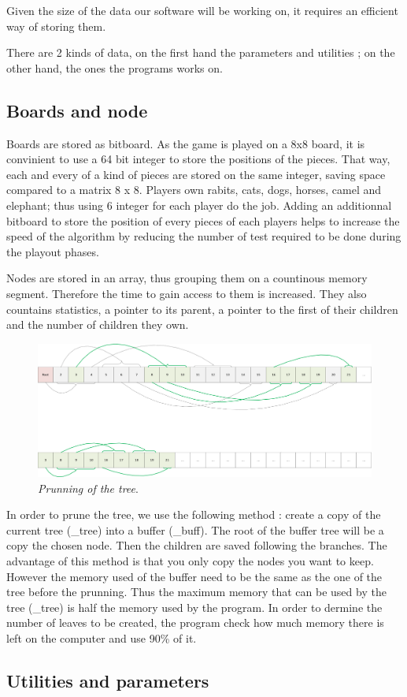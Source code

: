 Given the size of the data our software will be working on, it requires an efficient way of storing them.

There are 2 kinds of data, on the first hand the parameters and utilities ; on the other hand, the ones the programs works on.
\subsection{Boards and node}
Boards are stored as bitboard. As the game is played on a 8x8 board, it is convinient to use a 64 bit integer to store the positions of the pieces.
That way, each and every of a kind of pieces are stored on the same integer, saving space compared to a matrix 8 x 8.
Players own rabits, cats, dogs, horses, camel and elephant; thus using 6 integer for each player do the job. Adding an additionnal bitboard to store the position of every pieces of each players helps to increase the speed of the algorithm by reducing the number of test required to be done during the playout phases.

Nodes are stored in an array, thus grouping them on a countinous memory segment. Therefore the time to gain access to them is increased.
They also countains statistics, a pointer to its parent, a pointer to the first of their children and the number of children they own.

\begin{figure}[!h] 
\centerline{\includegraphics[scale=0.70]{Data_Structure/Img/array.png}}
\caption{\label{fig:array}\textit{Prunning of the tree}.}
\end{figure}
In order to prune the tree, we use the following method : create a copy of the current tree (\_tree) into a buffer (\_buff).
The root of the buffer tree will be a copy the chosen node. Then the children are saved following the branches. The advantage of this method is that you only copy the nodes you want to keep.
However the memory used of the buffer need to be the same as the one of the tree before the prunning. Thus the maximum memory that can be used by the tree (\_tree) is half the memory used by the program.
In order to dermine the number of leaves to be created, the program check how much memory there is left on the computer and use 90\% of it.


\subsection{Utilities and parameters}

